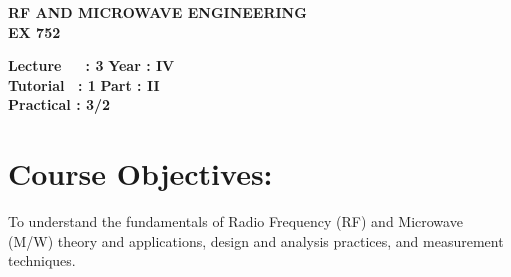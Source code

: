 \begin{center}
    \textbf{\huge{\uppercase{RF and Microwave Engineering}}}
    \\
    \vspace{.5cm}
    \textbf{\large{EX 752}}
\end{center}

\noindent\textbf{Lecture\ \ \ : 3} \hfill \textbf{Year : IV} \\
\textbf{Tutorial \ : 1} \hfill \textbf{Part : II } \\
\textbf{Practical : 3/2}  \\

\par
\noindent 
\section*{Course Objectives:}
To understand the fundamentals of Radio Frequency (RF) and Microwave (M/W) theory and applications, design and analysis practices, and measurement techniques.


